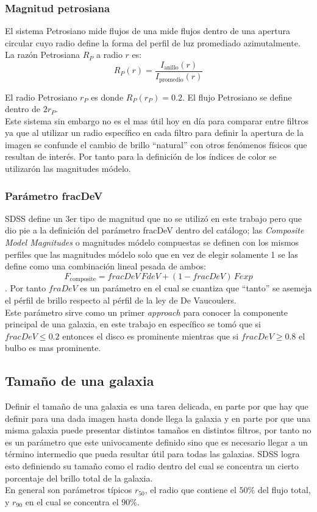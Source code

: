 \documentclass{article}
\begin{document}
\subsubsection{Magnitud petrosiana}
El sistema Petrosiano \citep{1976ApJ...209L...1P} mide flujos de una mide flujos dentro de una apertura circular cuyo radio define la forma del perfil de luz promediado azimutalmente. La razón Petrosiana $R_P$ a radio $r$ es:
\begin{equation}
    R_P(r) = \frac{I_{\text{anillo}}(r)}{I_{\text{promedio}}(r)}
\end{equation}


El radio Petrosiano $r_P$ es donde $R_P(r_P) = 0.2$. El flujo Petrosiano se define dentro de $2r_P$.
\\

Este sistema sin embargo no es el mas útil hoy en día para comparar entre filtros ya que al utilizar un radio específico en cada filtro para definir la apertura de la imagen se confunde el cambio de brillo ``natural'' con otros fenómenos físicos que resultan de interés.  
Por tanto para la definición de los índices de color se utilizarón las magnitudes módelo.


\subsubsection{Parámetro fracDeV}
SDSS define un 3er tipo de magnitud que no se utilizó en este trabajo pero que dio pie a la definición del parámetro fracDeV dentro del catálogo; las \textit{Composite Model Magnitudes} o magnitudes módelo compuestas se definen con los mismos perfiles que las magnitudes módelo solo que en vez de elegir solamente 1 se las define como una combinación lineal pesada de ambos: \[F_{\text{composite}} = fracDeV \,FdeV + (1 - fracDeV)\,Fexp\]. 
Por tanto $fraDeV$ es un parámetro en el cual se cuantiza que ``tanto'' se asemeja el pérfil de brillo respecto al pérfil de la ley de De Vaucoulers.\\
Este parámetro sirve como un primer \textit{approach} para conocer la componente principal de una galaxia, en este trabajo en específico se tomó que si $fracDeV \leq 0.2$ entonces el disco es prominente mientras que si $fracDeV \geq 0.8$ el bulbo es mas prominente.


\subsection{Tamaño de una galaxia}
Definir el tamaño de una galaxia es una tarea delicada, en parte por que hay que definir para una dada imagen hasta donde llega la galaxia y en parte por que una misma galaxia puede presentar distintos tamaños en distintos filtros, por tanto no es un parámetro que este univocamente definido sino que es necesario llegar a un término intermedio que pueda resultar útil para todas las galaxias. 
SDSS logra esto definiendo su tamaño como el radio dentro del cual se concentra un cierto porcentaje del brillo total de la galaxia. \\
En general son parámetros típicos $r_{50}$, el radio que contiene el $50\%$ del flujo total, y $r_{90}$ en el cual se concentra el $90\%$.
\end{document}
